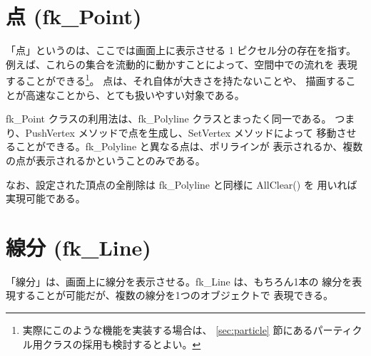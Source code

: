 \section{点 (fk\_Point)}
「点」というのは、ここでは画面上に表示させる 1 ピクセル分の存在を指す。
例えば、これらの集合を流動的に動かすことによって、空間中での流れを
表現することができる\footnote{実際にこのような機能を実装する場合は、
\ref{sec:particle} 節にあるパーティクル用クラスの採用も検討するとよい。}。
点は、それ自体が大きさを持たないことや、
描画することが高速なことから、とても扱いやすい対象である。

fk\_Point クラスの利用法は、fk\_Polyline クラスとまったく同一である。
つまり、PushVertex メソッドで点を生成し、SetVertex メソッドによって
移動させることができる。fk\_Polyline と異なる点は、ポリラインが
表示されるか、複数の点が表示されるかということのみである。

なお、設定された頂点の全削除は fk\_Polyline と同様に AllClear() を
用いれば実現可能である。

\section{線分 (fk\_Line)}
「線分」は、画面上に線分を表示させる。fk\_Line は、もちろん1本の
線分を表現することが可能だが、複数の線分を1つのオブジェクトで
表現できる。

